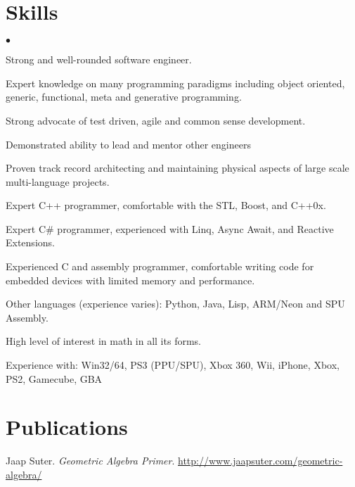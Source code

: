 \documentclass[margin,line]{resume}
\newenvironment{list2}{
  \begin{list}{$\bullet$}{%
      \setlength{\itemsep}{0in}
      \setlength{\parsep}{0in} \setlength{\parskip}{0in}
      \setlength{\topsep}{0in} \setlength{\partopsep}{0in}
      \setlength{\leftmargin}{0.2in}}}{\end{list}}
\begin{document}
\begin{resume}
\section{\sc Skills}
\begin{list2}
\item Strong and well-rounded software engineer.
\item Expert knowledge on many programming paradigms including object oriented, generic, functional, meta and generative programming.
\item Strong advocate of test driven, agile and common sense development.
\item Demonstrated ability to lead and mentor other engineers
\item Proven track record architecting and maintaining physical aspects of large scale multi-language projects.
\item Expert C++ programmer, comfortable with the STL, Boost, and C++0x.
\item Expert C\# programmer, experienced with Linq, Async Await, and Reactive Extensions.
\item Experienced C and assembly programmer, comfortable writing code for embedded devices with limited memory and performance.
\item Other languages (experience varies): Python, Java, Lisp, ARM/Neon and SPU Assembly.
\item High level of interest in math in all its forms.
\item Experience with: Win32/64, PS3 (PPU/SPU), Xbox 360, Wii, iPhone, Xbox, PS2, Gamecube, GBA
\end{list2}

\section{\sc Publications}
\vspace{.5cm}
Jaap Suter. \textsl{Geometric Algebra Primer}. \url{http://www.jaapsuter.com/geometric-algebra/}
	

\end{resume}
\end{document}

